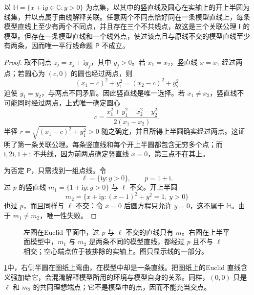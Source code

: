 \begin{proposition}
	\label{g1:prop:hyperbolic-incidence-model}
	以 \(\mathbb H=\{x+\mathrm i y\in\mathbb C:y>0\}\) 为点集，以其中的竖直线及圆心在实轴上的开上半圆为线集，并以点属于曲线解释关联。任意两个不同点恰好同在一条模型直线上，每条模型直线上至少有两个不同点，并且存在三个不共线点，故这是三个关联公理 \(\mathsf I\) 的模型。但存在一条模型直线和一个线外点，使过该点且与原线不交的模型直线至少有两条，因而唯一平行线命题 \(\mathsf P\) 不成立。
\end{proposition}
\begin{proof}
	取不同点 \(z_j=x_j+\mathrm i y_j\)，其中 \(y_j>0\)。若 \(x_1=x_2\)，竖直线 \(x=x_1\) 经过两点；若圆心为 \((c,0)\) 的圆也经过两点，则
	\[
		(x_1-c)^2+y_1^2=(x_2-c)^2+y_2^2
	\]
	迫使 \(y_1=y_2\)，与两点不同矛盾。因此竖直线是唯一选择。若 \(x_1\ne x_2\)，竖直线不可能同时经过两点，上式唯一确定圆心
	\[
		c=\frac{x_1^2+y_1^2-x_2^2-y_2^2}{2(x_1-x_2)}.
	\]
	半径 \(r=\sqrt{(x_1-c)^2+y_1^2}>0\) 随之确定，并且所得上半圆确实经过两点。这证明了第一条关联公理。每条竖直线和每个开上半圆都包含无穷多个点；而 \(\mathrm i,2\mathrm i,1+\mathrm i\) 不共线，因为前两点确定竖直线 \(x=0\)，第三点不在其上。

	为否定 \(\mathsf P\)，只需找到一组点线。令
	\[
		\ell=\{\mathrm i y:y>0\},\qquad p=1+\mathrm i.
	\]
	过 \(p\) 的竖直线 \(m_1=\{1+\mathrm i y:y>0\}\) 与 \(\ell\) 不交。开上半圆
	\[
		m_2=\{x+\mathrm i y:(x-1)^2+y^2=1,\ y>0\}
	\]
	也过 \(p\)，而且同样与 \(\ell\) 不交：令 \(x=0\) 后圆方程只允许 \(y=0\)，这不属于 \(\mathbb H\)。由于 \(m_1\ne m_2\)，唯一性失败。
\end{proof}

\begin{figure}[htbp]
	\centering
	
	\caption[平行关系依赖所选模型]{左图在Euclid 平面中，过 \(p\) 与 \(\ell\) 不交的直线只有 \(m\)。右图在上半平面模型中，\(m_1\) 与 \(m_2\) 是两条不同的模型直线，都经过 \(p\) 且不与 \(\ell\) 相交；空心端点位于被排除的实轴上。图只显示线的一部分。}
	\label{g1:fig:axiom-parallel-models}
\end{figure}

\cref{g1:fig:axiom-parallel-models}中，右侧半圆在图纸上弯曲，在模型中却是一条直线。把图纸上的Euclid 直线含义强加给它，会混淆解释模型所用的环境与模型自身的关系。同样，\((0,0)\) 只是 \(\ell\) 和 \(m_2\) 的共同理想端点；它不是模型中的点，因而不能充当交点。

